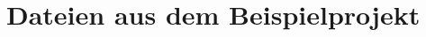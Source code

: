 \documentclass[./einleitung.tex]{subfiles}
\begin{document}
    \section{Dateien aus dem Beispielprojekt}\label{sec:dateien-aus-dem-beispielprojekt}
\end{document}
